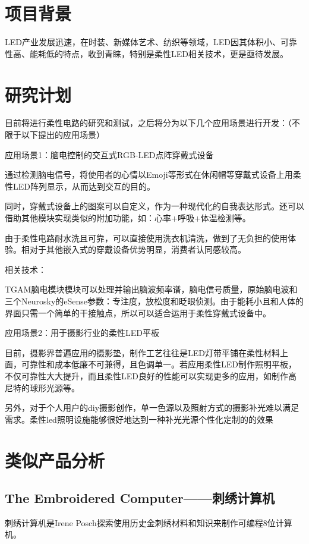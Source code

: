 \chapter{项目背景}
  LED产业发展迅速，在时装、新媒体艺术、纺织等领域，LED因其体积小、可靠性高、能耗低的特点，收到青睐，特别是柔性LED相关技术，更是亟待发展。
  
\chapter{研究计划}
目前将进行柔性电路的研究和测试，之后将分为以下几个应用场景进行开发：（不限于以下提出的应用场景）

{\heiti 应用场景1：脑电控制的交互式RGB-LED点阵穿戴式设备 }

通过检测脑电信号，将使用者的心情以Emoji等形式在休闲帽等穿戴式设备上用柔性LED阵列显示，从而达到交互的目的。

同时，穿戴式设备上的图案可以自定义，作为一种现代化的自我表达形式。还可以借助其他模块实现类似的附加功能，如：心率+呼吸+体温检测等。

由于柔性电路耐水洗且可靠，可以直接使用洗衣机清洗，做到了无负担的使用体验。相对于其他嵌入式的穿戴设备优势明显，消费者认同感较高。

相关技术：

TGAM脑电模块模块可以处理并输出脑波频率谱，脑电信号质量，原始脑电波和三个Neurosky的eSense参数：专注度，放松度和眨眼侦测。由于能耗小且和人体的界面只需一个简单的干接触点，所以可以适合运用于柔性穿戴式设备中。

{\heiti 应用场景2：用于摄影行业的柔性LED平板 }

目前，摄影界普遍应用的摄影垫，制作工艺往往是LED灯带平铺在柔性材料上面，可靠性和成本低廉不可兼得，且色调单一。若应用柔性LED制作照明平板，不仅可靠性大大提升，而且柔性LED良好的性能可以实现更多的应用，如制作高尼特的球形光源等。

另外，对于个人用户的diy摄影创作，单一色源以及照射方式的摄影补光难以满足需求。柔性led照明设施能够很好地达到一种补光光源个性化定制的的效果

\chapter{类似产品分析}  
\section{The Embroidered Computer——刺绣计算机}
刺绣计算机是Irene Posch探索使用历史金刺绣材料和知识来制作可编程8位计算机。

